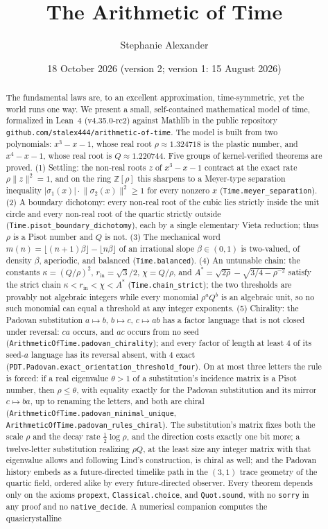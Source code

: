 \documentclass[11pt]{amsart}
\title{The Arithmetic of Time}
\author{Stephanie Alexander}
\date{18 October 2026 (version 2; version 1: 15 August 2026)}
\theoremstyle{plain}
\theoremstyle{definition}
\theoremstyle{remark}
\newcommand{\leanpin}{Lean~4 (v4.35.0-rc2) against Mathlib}
\begin{document}
\begin{abstract}
The fundamental laws are, to an excellent approximation, time-symmetric, yet the world runs one way. We present a small, self-contained mathematical model of time, formalized in \leanpin{} in the public repository \texttt{github.com/stalex444/arithmetic-of-time}. The model is built from two polynomials: $x^3 - x - 1$, whose real root $\rho \approx 1.324718$ is the plastic number, and $x^4 - x - 1$, whose real root is $Q \approx 1.220744$. Five groups of kernel-verified theorems are proved. (1) Settling: the non-real roots $z$ of $x^3 - x - 1$ contract at the exact rate $\rho \lVert z \rVert^2 = 1$, and on the ring $\mathbb{Z}[\rho]$ this sharpens to a Meyer-type separation inequality $\lvert \sigma_1(x) \rvert \cdot \lVert \sigma_2(x) \rVert^2 \ge 1$ for every nonzero $x$ (\texttt{Time.meyer\_separation}). (2) A boundary dichotomy: every non-real root of the cubic lies strictly inside the unit circle and every non-real root of the quartic strictly outside (\texttt{Time.pisot\_boundary\_dichotomy}), each by a single elementary Vieta reduction; thus $\rho$ is a Pisot number and $Q$ is not. (3) The mechanical word $m(n) = \lfloor (n+1)\beta \rfloor - \lfloor n\beta \rfloor$ of an irrational slope $\beta \in (0,1)$ is two-valued, of density $\beta$, aperiodic, and balanced (\texttt{Time.balanced}). (4) An untunable chain: the constants $\kappa = (Q/\rho)^2$, $r_{\mathrm{in}} = \sqrt{3}/2$, $\chi = Q/\rho$, and $A^* = \sqrt{2\rho} - \sqrt{3/4 - \rho^{-2}}$ satisfy the strict chain $\kappa < r_{\mathrm{in}} < \chi < A^*$ (\texttt{Time.chain\_strict}); the two thresholds are provably not algebraic integers while every monomial $\rho^a Q^b$ is an algebraic unit, so no such monomial can equal a threshold at any integer exponents. (5) Chirality: the Padovan substitution $a \mapsto b$, $b \mapsto c$, $c \mapsto ab$ has a factor language that is not closed under reversal: $ca$ occurs, and $ac$ occurs from no seed (\texttt{ArithmeticOfTime.padovan\_chirality}); and every factor of length at least $4$ of its seed-$a$ language has its reversal absent, with $4$ exact (\texttt{PDT.Padovan.exact\_orientation\_threshold\_four}). On at most three letters the rule is forced: if a real eigenvalue $\theta > 1$ of a substitution's incidence matrix is a Pisot number, then $\rho \le \theta$, with equality exactly for the Padovan substitution and its mirror $c \mapsto ba$, up to renaming the letters, and both are chiral (\texttt{ArithmeticOfTime.padovan\_minimal\_unique}, \texttt{ArithmeticOfTime.padovan\_rules\_chiral}). The substitution's matrix fixes both the scale $\rho$ and the decay rate $\tfrac12 \log \rho$, and the direction costs exactly one bit more; a twelve-letter substitution realizing $\rho Q$, at the least size any integer matrix with that eigenvalue allows and following Lind's construction, is chiral as well; and the Padovan history embeds as a future-directed timelike path in the $(3,1)$ trace geometry of the quartic field, ordered alike by every future-directed observer. Every theorem depends only on the axioms \texttt{propext}, \texttt{Classical.choice}, and \texttt{Quot.sound}, with no \texttt{sorry} in any proof and no \texttt{native\_decide}. A numerical companion computes the quasicrystalline 
\end{abstract}
\end{document}
